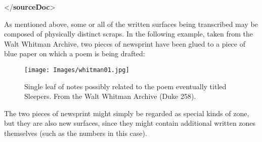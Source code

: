 \begin{shaded}
\hspace*{1em}\mbox{}\newline 
\hspace*{1em}\hspace*{1em}\mbox{}\newline 
\hspace*{1em}\mbox{}\newline 
{}\mbox{}\newline 
{</\textbf{sourceDoc}>}\end{shaded}\egroup\par \par
As mentioned above, some or all of the written surfaces being transcribed may be composed of physically distinct scraps. In the following example, taken from the Walt Whitman Archive, two pieces of newsprint have been glued to a piece of blue paper on which a poem is being drafted: \begin{figure}[htbp]
\noindent\noindent\texttt{[image: Images/whitman01.jpg]}
\caption{\label{sleeprs}Single leaf of notes possibly related to the poem eventually titled Sleepers. From the Walt Whitman Archive (Duke 258).}\end{figure}
 The two pieces of newsprint might simply be regarded as special kinds of zone, but they are also new surfaces, since they might contain additional written zones themselves (such as the numbers in this case).\par
